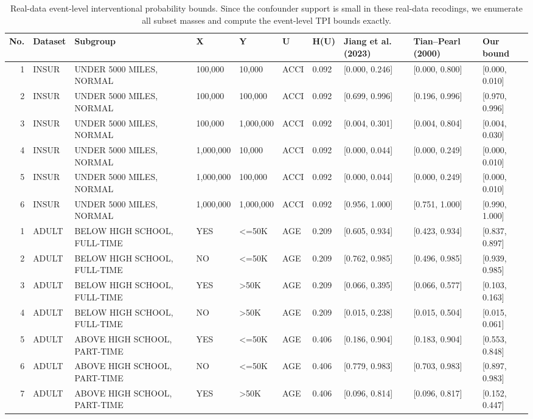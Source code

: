 \begin{table}
\caption{Real-data event-level interventional probability bounds. Since the confounder support is small in these real-data recodings, we enumerate all subset masses and compute the event-level TPI bounds exactly.}
\label{tab:o2-table6}
\begin{tabular}{rlllllllll}
\toprule
No. & Dataset & Subgroup & X & Y & U & H(U) & Jiang et al. (2023) & Tian--Pearl (2000) & Our bound \\
\midrule
1 & INSUR & UNDER 5000 MILES, NORMAL & 100,000 & 10,000 & ACCI & 0.092 & [0.000, 0.246] & [0.000, 0.800] & [0.000, 0.010] \\
2 & INSUR & UNDER 5000 MILES, NORMAL & 100,000 & 100,000 & ACCI & 0.092 & [0.699, 0.996] & [0.196, 0.996] & [0.970, 0.996] \\
3 & INSUR & UNDER 5000 MILES, NORMAL & 100,000 & 1,000,000 & ACCI & 0.092 & [0.004, 0.301] & [0.004, 0.804] & [0.004, 0.030] \\
4 & INSUR & UNDER 5000 MILES, NORMAL & 1,000,000 & 10,000 & ACCI & 0.092 & [0.000, 0.044] & [0.000, 0.249] & [0.000, 0.010] \\
5 & INSUR & UNDER 5000 MILES, NORMAL & 1,000,000 & 100,000 & ACCI & 0.092 & [0.000, 0.044] & [0.000, 0.249] & [0.000, 0.010] \\
6 & INSUR & UNDER 5000 MILES, NORMAL & 1,000,000 & 1,000,000 & ACCI & 0.092 & [0.956, 1.000] & [0.751, 1.000] & [0.990, 1.000] \\
1 & ADULT & BELOW HIGH SCHOOL, FULL-TIME & YES & <=50K & AGE & 0.209 & [0.605, 0.934] & [0.423, 0.934] & [0.837, 0.897] \\
2 & ADULT & BELOW HIGH SCHOOL, FULL-TIME & NO & <=50K & AGE & 0.209 & [0.762, 0.985] & [0.496, 0.985] & [0.939, 0.985] \\
3 & ADULT & BELOW HIGH SCHOOL, FULL-TIME & YES & >50K & AGE & 0.209 & [0.066, 0.395] & [0.066, 0.577] & [0.103, 0.163] \\
4 & ADULT & BELOW HIGH SCHOOL, FULL-TIME & NO & >50K & AGE & 0.209 & [0.015, 0.238] & [0.015, 0.504] & [0.015, 0.061] \\
5 & ADULT & ABOVE HIGH SCHOOL, PART-TIME & YES & <=50K & AGE & 0.406 & [0.186, 0.904] & [0.183, 0.904] & [0.553, 0.848] \\
6 & ADULT & ABOVE HIGH SCHOOL, PART-TIME & NO & <=50K & AGE & 0.406 & [0.779, 0.983] & [0.703, 0.983] & [0.897, 0.983] \\
7 & ADULT & ABOVE HIGH SCHOOL, PART-TIME & YES & >50K & AGE & 0.406 & [0.096, 0.814] & [0.096, 0.817] & [0.152, 0.447] \\

\end{tabular}
\end{table}
